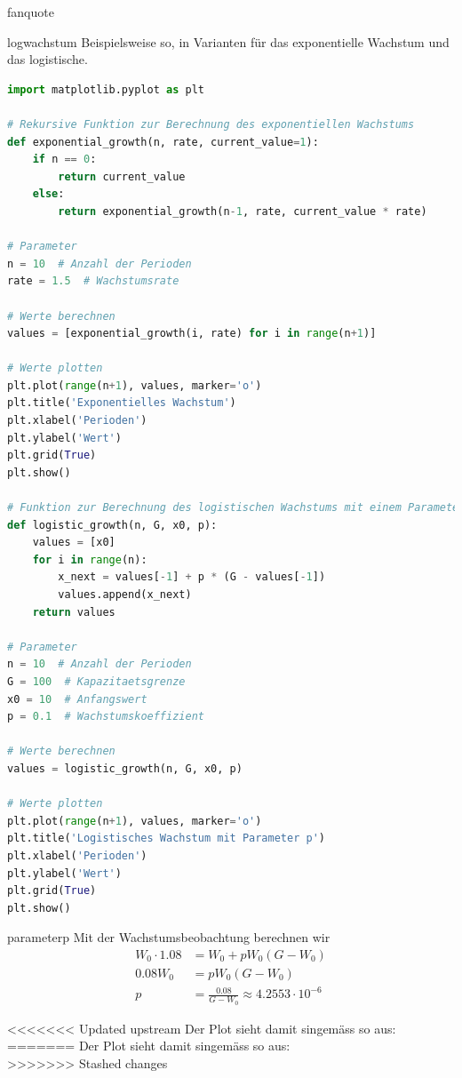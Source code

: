 \documentclass[%
<<<<<<< Updated upstream
<<<<<<< Updated upstream
11pt,%
twoside,%
titlepage,%
german,%
headsepline%
]{scrartcl}
\begin{document}
\begin{uebenv}{fanquote}
\begin{lsg}{logwachstum}
Beispielsweise so, in Varianten für das exponentielle Wachstum und das logistische.

\begin{lstlisting}[language=Python]
import matplotlib.pyplot as plt

# Rekursive Funktion zur Berechnung des exponentiellen Wachstums
def exponential_growth(n, rate, current_value=1):
    if n == 0:
        return current_value
    else:
        return exponential_growth(n-1, rate, current_value * rate)

# Parameter
n = 10  # Anzahl der Perioden
rate = 1.5  # Wachstumsrate

# Werte berechnen
values = [exponential_growth(i, rate) for i in range(n+1)]

# Werte plotten
plt.plot(range(n+1), values, marker='o')
plt.title('Exponentielles Wachstum')
plt.xlabel('Perioden')
plt.ylabel('Wert')
plt.grid(True)
plt.show()

# Funktion zur Berechnung des logistischen Wachstums mit einem Parameter p
def logistic_growth(n, G, x0, p):
    values = [x0]
    for i in range(n):
        x_next = values[-1] + p * (G - values[-1])
        values.append(x_next)
    return values

# Parameter
n = 10  # Anzahl der Perioden
G = 100  # Kapazitaetsgrenze
x0 = 10  # Anfangswert
p = 0.1  # Wachstumskoeffizient

# Werte berechnen
values = logistic_growth(n, G, x0, p)

# Werte plotten
plt.plot(range(n+1), values, marker='o')
plt.title('Logistisches Wachstum mit Parameter p')
plt.xlabel('Perioden')
plt.ylabel('Wert')
plt.grid(True)
plt.show()
\end{lstlisting}
\end{lsg}

\begin{lsg}{parameterp}
    Mit der Wachstumsbeobachtung berechnen wir
    \begin{align*}
        W_0\cdot1.08 &= W_0+pW_0(G-W_0)\\
        0.08W_0 &= pW_0(G-W_0)\\
        p &= \frac{0.08}{G-W_0}\approx4.2553\cdot10^{-6}
    \end{align*}

<<<<<<< Updated upstream
    Der Plot sieht damit singemäss so aus:\\
=======
Der Plot sieht damit singemäss so aus:\\
>>>>>>> Stashed changes


\end{lsg}
\end{uebenv}
\end{document}
